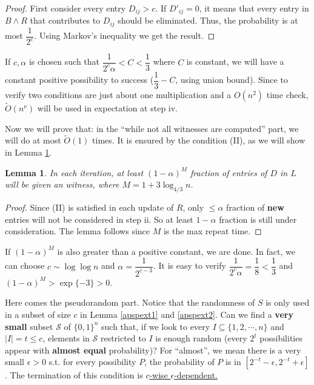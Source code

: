 \documentclass[11pt]{article}
\theoremstyle{plain}
\newtheorem{lemma}{Lemma}[section]
\begin{document}
\begin{proof}
First consider every entry $D_{ij}>c$. If $D'_{ij}=0$, it means that every entry in $B\land R$ that contributes to $D_{ij}$ should be eliminated. Thus, the probability is at most $\dfrac{1}{2^c}$. Using Markov's inequality we get the result.
\end{proof}

If $c,\alpha$ is chosen such that $\dfrac{1}{2^c\alpha}<C<\dfrac{1}{3}$ where $C$ is constant, we will have a constant positive possibility to success ($\dfrac{1}{3}-C$, using union bound). Since to verify two conditions are just about one multiplication and a $O(n^2)$ time check, $\tilde O(n^\nu)$ will be used in expectation at step iv. 

Now we will prove that: in the ``while not all witnesses are computed'' part, we will do at most $\tilde O(1)$ times. It is ensured by the condition (II), as we will show in Lemma \ref{apspext3}.

\begin{lemma}
\label{apspext3}
In each iteration, at least $(1-\alpha)^{M}$ fraction of entries of $D$ in $L$ will be given an witness, where $M=1+3\log_{4/3} n$.
\end{lemma}

\begin{proof}
Since (II) is satisfied in each update of $R$, only $\le \alpha$ fraction of \textbf{new} entries will not be considered in step ii. So at least $1-\alpha$ fraction is still under consideration. The lemma follows since $M$ is the max repeat time.
\end{proof}

If $(1-\alpha)^M$ is also greater than a positive constant, we are done. In fact, we can choose $c\sim\log \log n$ and $\alpha=\dfrac{1}{2^{c-3}}$. It is easy to verify $\dfrac{1}{2^c\alpha}=\dfrac{1}{8}<\dfrac{1}{3}$ and $(1-\alpha)^M>\exp\{-3\}>0$.

Here comes the pseudorandom part. Notice that the randomness of $S$ is only used in a subset of size $c$ in Lemma \ref{apspext1} and \ref{apspext2}. Can we find a \textbf{very small} subset $\mathcal{S}$ of $\{0,1\}^n$ such that, if we look to every $I\subseteq\{1,2,\cdots,n\}$ and $|I|=t\le c$, elements in $\mathcal{S}$ restricted to $I$ is enough random (every $2^t$ possibilities appear with \textbf{almost equal} probability)? For ``almost'', we mean there is a very small $\epsilon>0$ s.t. for every possibility $P$, the probability of $P$ is in $[2^{-t}-\epsilon,2^{-t}+\epsilon]$. The termination of this condition is \underline{$c$-wise $\epsilon$-dependent.}
\end{document}
